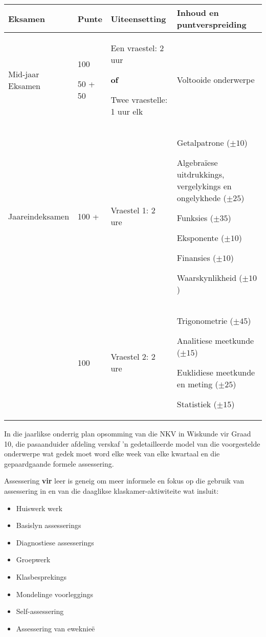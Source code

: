 \begin{table}[H]
\begin{center}
\begin{tabular} {|p{2cm}|p{1.5cm}|p{3cm}|p{4.5cm}|} \hline
\textbf{Eksamen} &
\textbf{Punte} &
\textbf{Uiteensetting} &
\textbf{Inhoud en puntverspreiding} \\ \hline
Mid-jaar Eksamen &
100 \par 50 + 50 &
Een vraestel: 2 uur\par \textbf{of} \par
Twee vraestelle: 1 uur elk &
Voltooide onderwerpe \\ \hline
Jaareindeksamen	&
100 + &
Vraestel 1: 2 ure &
Getalpatrone ($\pm 10$) \par 
Algebra\"{i}ese uitdrukkings, vergelykings en ongelykhede ($\pm 25$)\par 
Funksies ($\pm 35$)\par 
Eksponente ($\pm 10$)\par 
Finansies ($\pm 10$)\par 
Waarskynlikheid ($\pm 10$)
\\ \hline
&
100 &
Vraestel 2: 2 ure &
Trigonometrie ($\pm 45$) \par 
Analitiese meetkunde ($\pm 15$)\par 
Euklidiese meetkunde en meting ($\pm 25$)\par 
Statistiek ($\pm 15$)
\\ \hline
\end{tabular}
 \end{center}
\end{table}

In die jaarlikse onderrig plan opsomming van die NKV in Wiskunde vir Graad 10, die pasaanduider afdeling verskaf 'n gedetailleerde model van die voorgestelde onderwerpe wat gedek moet word elke week van elke kwartaal en die gepaardgaande formele assessering.

Assessering \textbf{vir} leer is geneig om meer informele en fokus op die gebruik van assessering in en van die daaglikse klaskamer-aktiwiteite wat insluit:
\begin{itemize}[noitemsep]
\item
Huiswerk werk
\item
Basislyn assesserings
\item
Diagnostiese assesserings
\item
Groepwerk
\item
Klasbesprekings
\item
Mondelinge voorleggings
\item
Self-assessering
\item
Assessering van eweknie\"{e}
\end{itemize}

